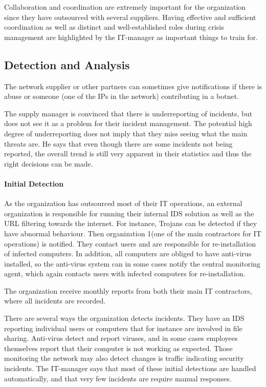 Collaboration and coordination are extremely important for the organization since they have outsourced with several suppliers. Having effective and sufficient coordination as well as distinct and well-established roles during crisis management are highlighted by the IT-manager as important things to train for.

\subsection{Detection and Analysis}

The network supplier or other partners can sometimes give notifications if there is abuse or someone (one of the IPs in the network) contributing in a botnet.

The supply manager is convinced that there is underreporting of incidents, but does not see it as a problem for their incident management. The potential high degree of underreporting does not imply that they miss seeing what the main threats are. He says that even though there are some incidents not being reported, the overall trend is still very apparent in their statistics and thus the right decisions can be made. 


\paragraph{Initial Detection}
As the organization has outsourced most of their IT operations, an external organization is responsible for running their internal IDS solution as well as the URL filtering towards the internet. For instance, Trojans can be detected if they have abnormal behaviour. Then organization 1(one of the main contractors for IT operations) is notified. They contact users and are responsible for re-installation of infected computers. In addition, all computers are obliged to have anti-virus installed, so the anti-virus system can in some cases notify the central monitoring agent, which again contacts users with infected computers for re-installation. 

The organization receive monthly reports from both their main IT contractors, where all incidents are recorded. 

There are several ways the organization detects incidents. They have an \ac{IDS} reporting individual users or computers that for instance are involved in file sharing. Anti-virus detect and report viruses, and in some cases employees themselves report that their computer is not working as expected. Those monitoring the network may also detect changes is traffic indicating security incidents. The IT-manager says that most of these initial detections are handled automatically, and that very few incidents are require manual responses.

